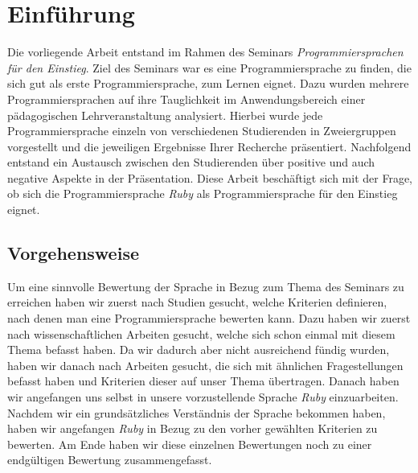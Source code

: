 \documentclass[12pt,DIV=14, version=first, BCOR=10mm,a4paper,twoside,parskip=half-,headsepline,headinclude]{scrartcl}
\begin{document}
\pagebreak
  \tableofcontents  %

\pagebreak

%



\section{Einführung}
\begin{flushleft}
Die vorliegende Arbeit entstand im Rahmen des Seminars \textit{\glqq Programmiersprachen für den Einstieg\grqq}. Ziel des Seminars war es eine Programmiersprache zu finden, die sich gut als erste Programmiersprache, zum Lernen eignet. Dazu wurden mehrere Programmiersprachen auf ihre Tauglichkeit im Anwendungsbereich einer pädagogischen Lehrveranstaltung analysiert. Hierbei wurde jede Programmiersprache einzeln von verschiedenen Studierenden in Zweiergruppen vorgestellt und die jeweiligen Ergebnisse Ihrer Recherche präsentiert. Nachfolgend entstand ein Austausch zwischen den Studierenden über positive und auch negative Aspekte in der Präsentation. Diese Arbeit beschäftigt sich mit der Frage, ob sich die Programmiersprache \textit{\glqq Ruby\grqq} als Programmiersprache für den Einstieg eignet.
\end{flushleft}

\subsection{Vorgehensweise}
\begin{flushleft}
Um eine sinnvolle Bewertung der Sprache in Bezug zum Thema des Seminars zu erreichen haben wir zuerst nach Studien gesucht, welche Kriterien definieren, nach denen man eine Programmiersprache bewerten kann. Dazu haben wir zuerst nach wissenschaftlichen Arbeiten gesucht, welche sich schon einmal mit diesem Thema befasst haben. Da wir dadurch aber nicht ausreichend fündig wurden, haben wir danach nach Arbeiten gesucht, die sich mit ähnlichen Fragestellungen befasst haben und Kriterien dieser auf unser Thema übertragen. Danach haben wir angefangen uns selbst in unsere vorzustellende Sprache \textit{\glqq Ruby\grqq} einzuarbeiten. Nachdem wir ein grundsätzliches Verständnis der Sprache bekommen haben, haben wir angefangen \textit{\glqq Ruby\grqq} in Bezug zu den vorher gewählten Kriterien zu bewerten. Am Ende haben wir diese einzelnen Bewertungen noch zu einer endgültigen Bewertung zusammengefasst.
\end{flushleft}
\end{document}
